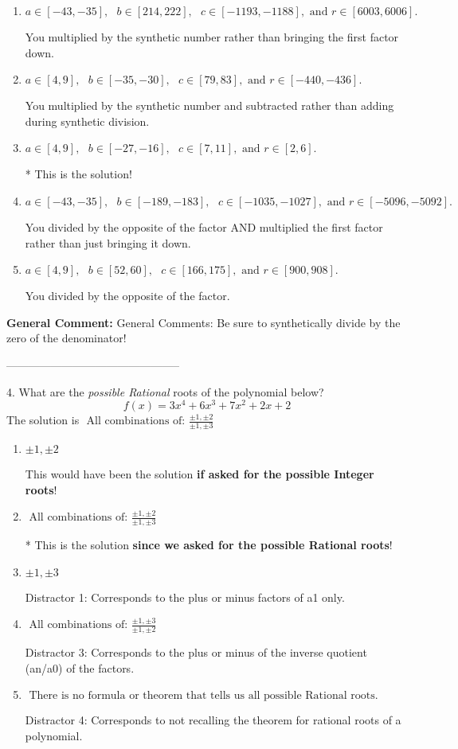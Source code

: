 \documentclass{extbook}[14pt]
\begin{document}
\begin{enumerate}[label=\Alph*.] 
\item $ a \in [-43, -35], \text{   } b \in [214, 222], \text{   } c \in [-1193, -1188], \text{   and   } r \in [6003, 6006]. $ 

  You multiplied by the synthetic number rather than bringing the first factor down. 
\item $ a \in [4, 9], \text{   } b \in [-35, -30], \text{   } c \in [79, 83], \text{   and   } r \in [-440, -436]. $ 

  You multiplied by the synthetic number and subtracted rather than adding during synthetic division. 
\item $ a \in [4, 9], \text{   } b \in [-27, -16], \text{   } c \in [7, 11], \text{   and   } r \in [2, 6]. $ 

 * This is the solution! 
\item $ a \in [-43, -35], \text{   } b \in [-189, -183], \text{   } c \in [-1035, -1027], \text{   and   } r \in [-5096, -5092]. $ 

  You divided by the opposite of the factor AND multiplied the first factor rather than just bringing it down. 
\item $ a \in [4, 9], \text{   } b \in [52, 60], \text{   } c \in [166, 175], \text{   and   } r \in [900, 908]. $ 

  You divided by the opposite of the factor. 
\end{enumerate} 
 
\textbf{General Comment:} General Comments: Be sure to synthetically divide by the zero of the denominator! 

-----------------------------------------------

4. What are the \textit{possible Rational} roots of the polynomial below?
\[ f(x) = 3x^{4} +6 x^{3} +7 x^{2} +2 x + 2 \] 
The solution is $ \text{ All combinations of: }\frac{\pm 1,\pm 2}{\pm 1,\pm 3} $ 

\begin{enumerate}[label=\Alph*.] 
\item $ \pm 1,\pm 2 $ 

 This would have been the solution \textbf{if asked for the possible Integer roots}! 
\item $ \text{ All combinations of: }\frac{\pm 1,\pm 2}{\pm 1,\pm 3} $ 

 * This is the solution \textbf{since we asked for the possible Rational roots}! 
\item $ \pm 1,\pm 3 $ 

  Distractor 1: Corresponds to the plus or minus factors of a1 only. 
\item $ \text{ All combinations of: }\frac{\pm 1,\pm 3}{\pm 1,\pm 2} $ 

  Distractor 3: Corresponds to the plus or minus of the inverse quotient (an/a0) of the factors.  
\item $ \text{ There is no formula or theorem that tells us all possible Rational roots.} $ 

  Distractor 4: Corresponds to not recalling the theorem for rational roots of a polynomial. 
\end{enumerate} 
 
\end{document}
